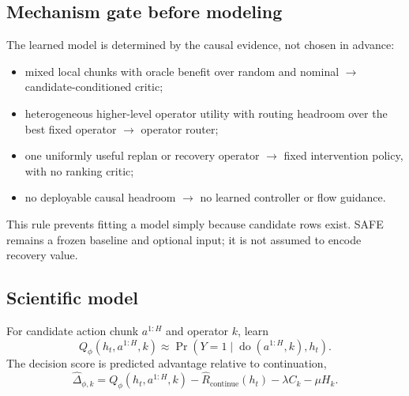 
\subsection{Mechanism gate before modeling}

The learned model is determined by the causal evidence, not chosen in advance:
\begin{itemize}
  \item mixed local chunks with oracle benefit over random and nominal $\rightarrow$ candidate-conditioned critic;
  \item heterogeneous higher-level operator utility with routing headroom over the best fixed operator $\rightarrow$ operator router;
  \item one uniformly useful replan or recovery operator $\rightarrow$ fixed intervention policy, with no ranking critic;
  \item no deployable causal headroom $\rightarrow$ no learned controller or flow guidance.
\end{itemize}
This rule prevents fitting a model simply because candidate rows exist. SAFE remains a frozen baseline and optional input; it is not assumed to encode recovery value.


\subsection{Scientific model}

For candidate action chunk $a^{1:H}$ and operator $k$, learn
\begin{equation}
  Q_{\phi}(h_t,a^{1:H},k)
  \approx \Pr(Y=1\mid \operatorname{do}(a^{1:H},k),h_t).
\end{equation}
The decision score is predicted advantage relative to continuation,
\begin{equation}
  \hat{\Delta}_{\phi,k}
  = Q_{\phi}(h_t,a^{1:H},k)-\hat{R}_{\mathrm{continue}}(h_t)
  -\lambda C_k-\mu H_k.
\end{equation}

